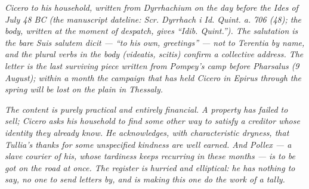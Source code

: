 
\textit{Cicero to his household, written from Dyrrhachium on
the day before the Ides of July 48 BC (the manuscript
dateline: \textit{Scr. Dyrrhach i Id. Quint. a. 706 (48)};
the body, written at the moment of despatch, gives
``Idib. Quint.''). The salutation is the bare
\textit{Suis salutem dicit} --- ``to his own, greetings'' ---
not to Terentia by name, and the plural verbs in the body
(\textit{videatis}, \textit{scitis}) confirm a collective
address. The letter is the last surviving piece written
from Pompey's camp before Pharsalus (9 August); within a
month the campaign that has held Cicero in Epirus through
the spring will be lost on the plain in Thessaly.}

\textit{The content is purely practical and entirely
financial. A property has failed to sell; Cicero asks his
household to find some other way to satisfy a creditor
whose identity they already know. He acknowledges, with
characteristic dryness, that Tullia's thanks for some
unspecified kindness are well earned. And Pollex --- a
slave courier of his, whose tardiness keeps recurring in
these months --- is to be got on the road at once. The
register is hurried and elliptical: he has nothing to say,
no one to send letters by, and is making this one do the
work of a tally.}
